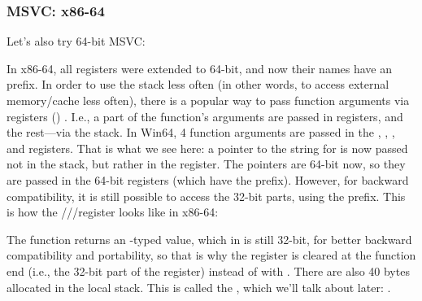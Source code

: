 \subsubsection{MSVC: x86-64}

Let's also try 64-bit MSVC:




In x86-64, all registers were extended to 64-bit, and now their names have an  prefix.
In order to use the stack less often (in other words, to access external memory/cache less often), there is
a popular way to pass function arguments via registers () .
I.e., a part of the function's arguments are passed in registers, and the rest---via the stack.
In Win64, 4 function arguments are passed in the \RCX, \RDX, , and  registers.
That is what we see here: a pointer to the string for \printf is now passed not in the stack, but rather in the \RCX register.
The pointers are 64-bit now, so they are passed in the 64-bit registers (which have the  prefix).
However, for backward compatibility, it is still possible to access the 32-bit parts, using the  prefix.
This is how the \RAX/\EAX/\AX/\AL register looks like in x86-64:


The \main function returns an \Tint{}-typed value, which in \CCpp is still 32-bit, for better backward compatibility
and portability, so that is why the \EAX register is cleared at the function end (i.e., the 32-bit
part of the register) instead of with \RAX{}.
There are also 40 bytes allocated in the local stack.
This is called the , which we'll talk about later: .

